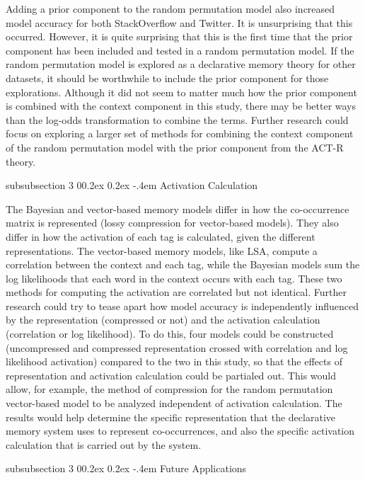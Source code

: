 \documentclass[man,donotrepeattitle]{apa6}
\makeatletter
\renewcommand{\subsubsection}{%
  \@startsection
  {subsubsection}%
  {3}%
  {\parindent}%
  {0\baselineskip \@plus 0.2ex \@minus 0.2ex}%
  {-.4em}%
  {\normalfont\normalsize\bfseries\addperi}}
\makeatother
\begin{document}
Adding a prior component to the random permutation model also increased model accuracy for both StackOverflow and Twitter.
It is unsurprising that this occurred.
However, it is quite surprising that this is the first time that the prior component has been included and tested in a random permutation model.
If the random permutation model is explored as a declarative memory theory for other datasets, it should be worthwhile to include the prior component for those explorations.
Although it did not seem to matter much how the prior component is combined with the context component in this study, 
there may be better ways than the log-odds transformation to combine the terms.
Further research could focus on exploring a larger set of methods for combining the context component of the random permutation model with the prior component from the ACT-R theory.

\subsubsection{Activation Calculation}

The Bayesian and vector-based memory models differ in how the co-occurrence matrix is represented (lossy compression for vector-based models).
They also differ in how the activation of each tag is calculated, given the different representations.
The vector-based memory models, like LSA, compute a correlation between the context and each tag, while the Bayesian models sum the log likelihoods that each word in the context occurs with each tag.
These two methods for computing the activation are correlated but not identical.
Further research could try to tease apart how model accuracy is independently influenced by the representation (compressed or not) and the activation calculation (correlation or log likelihood).
To do this, four models could be constructed (uncompressed and compressed representation crossed with correlation and log likelihood activation) compared to the two in this study,
so that the effects of representation and activation calculation could be partialed out.
This would allow, for example, the method of compression for the random permutation vector-based model to be analyzed independent of activation calculation.
The results would help determine the specific representation that the declarative memory system uses to represent co-occurrences,
and also the specific activation calculation that is carried out by the system.

\subsubsection{Future Applications}
\end{document}
